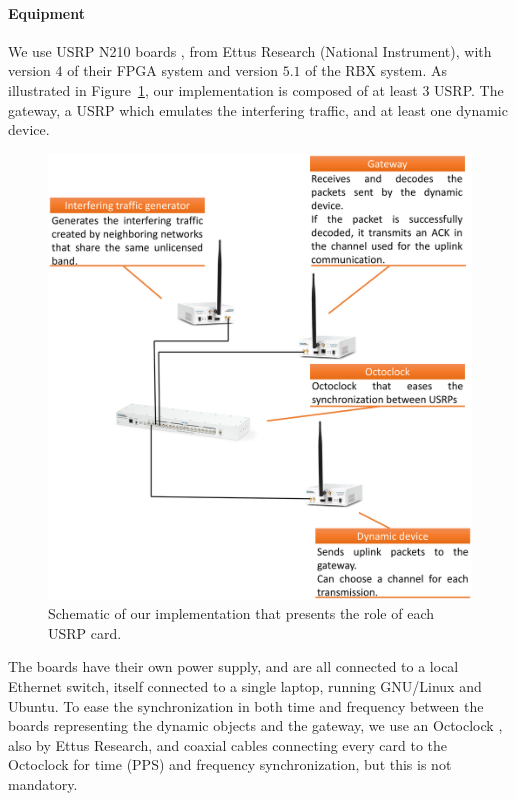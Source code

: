\paragraph{Equipment}

We use USRP N210 boards \cite{USRPDocumentation}, from Ettus Research (National Instrument),
with version $4$ of their FPGA system and version $5.1$ of the RBX system.
As illustrated in Figure~\ref{fig:42:our_demo}, our implementation is composed of at least $3$ USRP.
The gateway, a USRP which emulates the interfering traffic, and at least one dynamic device.

\begin{figure}[!t]
    \centering
    \includegraphics[width=0.70\linewidth]{2-Chapters/4-Chapter/IEEE_WCNC_2019__DemoICT.git/pictures/our-demo.eps}
    \caption{Schematic of our implementation that presents the role of each USRP card.}
    \label{fig:42:our_demo}
\end{figure}

The boards have their own power supply, and are all connected to a local Ethernet switch, itself connected to a single laptop, running GNU/Linux and Ubuntu.
To ease the synchronization in both time and frequency between the boards representing the dynamic objects and the gateway, we use an Octoclock \cite{OctoclockProduct}, also by Ettus Research,
and coaxial cables connecting every card to the Octoclock for time (PPS) and frequency synchronization, but this is not mandatory.


